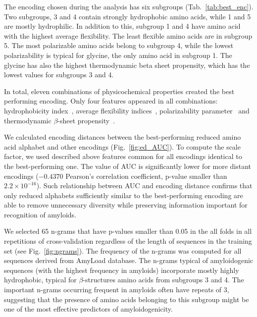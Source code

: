 \documentclass[a4,center,fleqn]{NAR}
\begin{document}
%
%
The encoding chosen during the analysis has six subgroups 
(Tab.~\ref{tab:best_enc}). Two subgroups, 3 and 4 contain strongly hydrophobic 
amino acids, while 1 and 5 are mostly hydrophilic. In addition to this, subgroup 
1 and 4 have amino acid with the highest average flexibility. The least flexible 
amino acids are in subgroup 5. The most polarizable amino acids belong to 
subgroup 4, while the lowest polarizability is typical for glycine, the only 
amino acid in subgroup 1. The glycine has also the highest thermodynamic beta 
sheet propensity, which has the lowest values for subgroups 3 and 4.

  In total, eleven combinations of physicochemical properties created the best 
performing encoding. Only four features appeared in all 
combinations: hydrophobicity index~\citep{argos_structural_1982}, average 
flexibility indices~\citep{bhaskaran_positional_1988}, polarizability 
parameter~\citep{charton_structural_1982} and thermodynamic $\beta$-sheet 
propensity~\citep{kim_thermodynamic_1993}.

  We calculated encoding distances between the best-performing reduced amino 
acid alphabet and other encodings (Fig.~\ref{fig:ed_AUC}). To compute the scale 
factor, we used described above features common for all encodings identical to 
the best-performing one. The value of AUC is significantly lower for more 
%
%
%
%
%
distant encodings ($-0.4370$ Pearson's correlation coefficient, p-value smaller 
than $2.2 \times 10^{-16}$). Such relationship between AUC and encoding distance 
confirms that only reduced alphabets sufficiently similar to the best-performing 
encoding are able to remove unnecessary diversity while preserving information 
important for recognition of amyloids.

  We selected 65 n-grams that have p-values smaller than 0.05 in the all folds 
in all repetitions of cross-validation regardless of the length of sequences in 
the training set (see Fig.~\ref{fig:ngrams}). The frequency of the n-grams was 
computed for all sequences derived from AmyLoad database. The n-grams typical of 
amyloidogenic sequences (with the highest frequency in amyloids) incorporate 
mostly highly hydrophobic, typical for $\beta$-structures amino acids from 
subgroups 3 and 4. The important n-grams occurring frequent in amyloids often 
have repeats of 3, suggesting that the presence of amino acids belonging to this 
subgroup might be one of the most effective predictors of amyloidogenicity.
\end{document}
